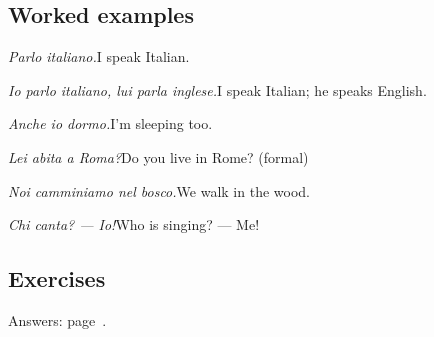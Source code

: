 \documentclass[11pt,a4paper,twoside,openright]{book}
\begin{document}
\subsection*{Worked examples}
\begin{examples}
\item\relax \textit{Parlo italiano.}\newline I speak Italian.
\item\relax \textit{Io parlo italiano, lui parla inglese.}\newline I speak Italian; he speaks English.
\item\relax \textit{Anche io dormo.}\newline I'm sleeping too.
\item\relax \textit{Lei abita a Roma?}\newline Do you live in Rome? (formal)
\item\relax \textit{Noi camminiamo nel bosco.}\newline We walk in the wood.
\item\relax \textit{Chi canta? — Io!}\newline Who is singing? — Me!
\end{examples}

\subsection*{Exercises}\label{les:infinitives-pronouns:exercises}
{\color{muted}\small Answers: page~\pageref{ans:infinitives-pronouns}.}
\end{document}
